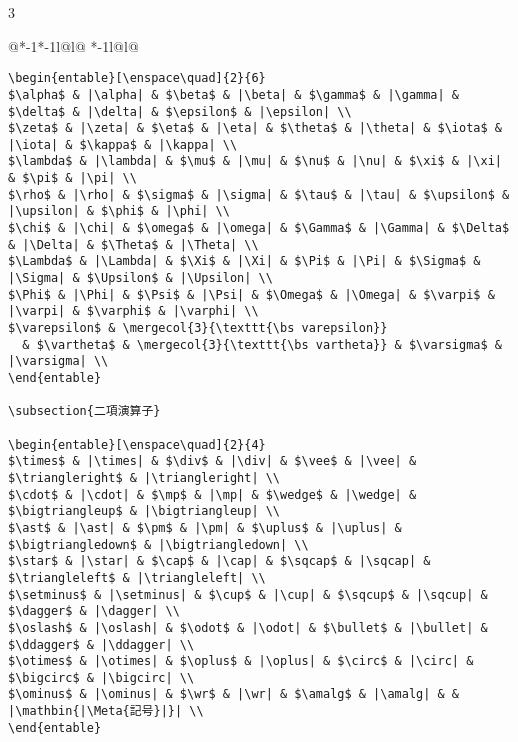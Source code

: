 \documentclass[10pt,a4paper,landscape,dvipdfmx]{jarticle}
\makeatletter
\def\set@etsep#1#2{\def\etcolsep{#1}\def\etitemsep{#2}}
\newenvironment{entable}[3][\quad\qquad]{%
  \set@etsep#1\relax\relax
  \begin{tabular}{%
    @{}*{\the\numexpr#3-1}{*{\the\numexpr#2-1}{l@{\etcolsep}}l@{\etitemsep}}%
    *{\the\numexpr#2-1}{l@{\etcolsep}}l@{}}}{%
  \end{tabular}}
\newcommand{\mergecol}[2]{\multicolumn{#1}{@{}l@{}}{#2}}
\newcommand{\Meta}[1]{$\langle$\mbox{}\emph{#1}\mbox{}$\rangle$}
\makeatother
\begin{document}
\begin{multicols}{3}
\begin{entable}[\enspace]{2}{1}
\begin{verbatim}
\begin{entable}[\enspace\quad]{2}{6}
$\alpha$ & |\alpha| & $\beta$ & |\beta| & $\gamma$ & |\gamma| & $\delta$ & |\delta| & $\epsilon$ & |\epsilon| \\
$\zeta$ & |\zeta| & $\eta$ & |\eta| & $\theta$ & |\theta| & $\iota$ & |\iota| & $\kappa$ & |\kappa| \\
$\lambda$ & |\lambda| & $\mu$ & |\mu| & $\nu$ & |\nu| & $\xi$ & |\xi| & $\pi$ & |\pi| \\
$\rho$ & |\rho| & $\sigma$ & |\sigma| & $\tau$ & |\tau| & $\upsilon$ & |\upsilon| & $\phi$ & |\phi| \\
$\chi$ & |\chi| & $\omega$ & |\omega| & $\Gamma$ & |\Gamma| & $\Delta$ & |\Delta| & $\Theta$ & |\Theta| \\
$\Lambda$ & |\Lambda| & $\Xi$ & |\Xi| & $\Pi$ & |\Pi| & $\Sigma$ & |\Sigma| & $\Upsilon$ & |\Upsilon| \\
$\Phi$ & |\Phi| & $\Psi$ & |\Psi| & $\Omega$ & |\Omega| & $\varpi$ & |\varpi| & $\varphi$ & |\varphi| \\
$\varepsilon$ & \mergecol{3}{\texttt{\bs varepsilon}}
  & $\vartheta$ & \mergecol{3}{\texttt{\bs vartheta}} & $\varsigma$ & |\varsigma| \\
\end{entable}

\subsection{二項演算子}

\begin{entable}[\enspace\quad]{2}{4}
$\times$ & |\times| & $\div$ & |\div| & $\vee$ & |\vee| & $\triangleright$ & |\triangleright| \\
$\cdot$ & |\cdot| & $\mp$ & |\mp| & $\wedge$ & |\wedge| & $\bigtriangleup$ & |\bigtriangleup| \\
$\ast$ & |\ast| & $\pm$ & |\pm| & $\uplus$ & |\uplus| & $\bigtriangledown$ & |\bigtriangledown| \\
$\star$ & |\star| & $\cap$ & |\cap| & $\sqcap$ & |\sqcap| & $\triangleleft$ & |\triangleleft| \\
$\setminus$ & |\setminus| & $\cup$ & |\cup| & $\sqcup$ & |\sqcup| & $\dagger$ & |\dagger| \\
$\oslash$ & |\oslash| & $\odot$ & |\odot| & $\bullet$ & |\bullet| & $\ddagger$ & |\ddagger| \\
$\otimes$ & |\otimes| & $\oplus$ & |\oplus| & $\circ$ & |\circ| & $\bigcirc$ & |\bigcirc| \\
$\ominus$ & |\ominus| & $\wr$ & |\wr| & $\amalg$ & |\amalg| & & |\mathbin{|\Meta{記号}|}| \\
\end{entable}


\end{verbatim}
\end{entable}
\end{multicols}
\end{document}
